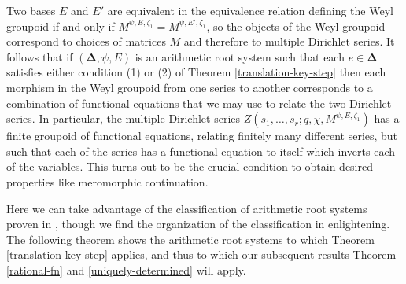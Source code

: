 \documentclass[11pt,letterpaper]{article}
\theoremstyle{definition}
\theoremstyle{remark}
\numberwithin{equation}{section}
\theoremstyle{dotless}
\newcommand{\hchi}{\psi} %
\newcommand{\gene}{\zeta_1} %
\begin{document}
Two bases $E$ and $E'$ are equivalent in the equivalence relation defining the Weyl groupoid if and only if $M^{\hchi,E,\gene} = M^{\hchi, E',\gene}$, so the objects of the Weyl groupoid correspond to choices of matrices $M$ and therefore to multiple Dirichlet series.  It follows that if $(\mathbf \Delta, \hchi, E)$ is an arithmetic root system such that each  $e\in \mathbf \Delta$ satisfies either condition (1) or (2) of Theorem \ref{translation-key-step} then each morphism in the Weyl groupoid from one series to another corresponds to a combination of functional equations that we may use to relate the two Dirichlet series. In particular, the multiple Dirichlet series $Z(s_1,\dots, s_r; q, \chi, M^{\hchi,E, \gene})$ has a finite groupoid of functional equations, relating finitely many different series, but such that each of the series has a functional equation to itself which inverts each of the variables. This turns out to be the crucial condition to obtain desired properties like meromorphic continuation.


Here we can take advantage of the classification of arithmetic root systems proven in \cite{HeckenbergerClassification}, though we find the organization of the classification in \cite{AndruskiewitschAngiono} enlightening. The following theorem shows the arithmetic root systems to which Theorem \ref{translation-key-step} applies, and thus to which our subsequent results Theorem \ref{rational-fn} and \ref{uniquely-determined} will apply.
\end{document}
